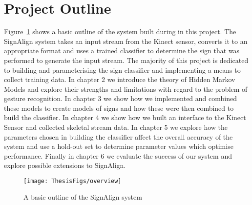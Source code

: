 \section{Project Outline}

Figure~\ref{fig:outline} shows a basic outline of the system built during in this project. The SignAlign system takes an input stream from the Kinect sensor, converts it to an appropriate format and uses a trained classifier to determine the sign that was performed to generate the input stream. The majority of this project is dedicated to building and parameterising the sign classifier and implementing a means to collect training data. In chapter 2 we introduce the theory of Hidden Markov Models and explore their strengths and limitations with regard to the problem of gesture recognition. In chapter 3 we show how we implemented and combined these models to create models of signs and how these were then combined to build the classifier. In chapter 4 we show how we built an interface to the Kinect Sensor and collected skeletal stream data. In chapter 5 we explore how the parameters chosen in building the classifier affect the overall accuracy of the system and use a hold-out set to determine parameter values which optimise performance. Finally in chapter 6 we evaluate the success of our system and explore possible extensions to SignAlign.

\begin{figure}[]
  \centering
    \texttt{[image: ThesisFigs/overview]}
  \caption{A basic outline of the SignAlign system}\label{fig:outline}
\end{figure}




